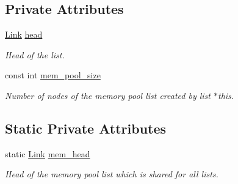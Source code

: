\subsection*{Private Attributes}
\begin{DoxyCompactItemize}
\item 
\hypertarget{classofeli_1_1list_aed33fb6086a95ce25dd474aef8063661}{\hyperlink{classofeli_1_1list_a7765ecb875543506d04dbd466f754503}{Link} \hyperlink{classofeli_1_1list_aed33fb6086a95ce25dd474aef8063661}{head}}\label{classofeli_1_1list_aed33fb6086a95ce25dd474aef8063661}

\begin{DoxyCompactList}\small\item\em Head of the list. \end{DoxyCompactList}\item 
\hypertarget{classofeli_1_1list_a4751e1b2279d0dcff01b0081d0dcbd19}{const int \hyperlink{classofeli_1_1list_a4751e1b2279d0dcff01b0081d0dcbd19}{mem\-\_\-pool\-\_\-size}}\label{classofeli_1_1list_a4751e1b2279d0dcff01b0081d0dcbd19}

\begin{DoxyCompactList}\small\item\em Number of nodes of the memory pool list created by list $\ast$this. \end{DoxyCompactList}\end{DoxyCompactItemize}
\subsection*{Static Private Attributes}
\begin{DoxyCompactItemize}
\item 
\hypertarget{classofeli_1_1list_a8a313f391f6672c8c26ab5d9c7f58396}{static \hyperlink{classofeli_1_1list_a7765ecb875543506d04dbd466f754503}{Link} \hyperlink{classofeli_1_1list_a8a313f391f6672c8c26ab5d9c7f58396}{mem\-\_\-head}}\label{classofeli_1_1list_a8a313f391f6672c8c26ab5d9c7f58396}

\begin{DoxyCompactList}\small\item\em Head of the memory pool list which is shared for all lists. \end{DoxyCompactList}\end{DoxyCompactItemize}
